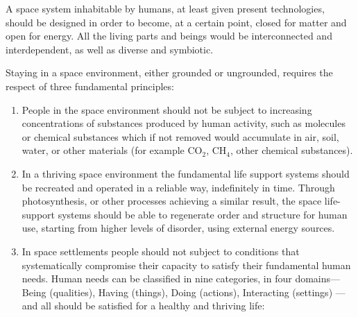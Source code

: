 \documentclass[letter,11pt]{article}
\begin{document}
A space system inhabitable by humans, at least given present technologies,
should be designed in order to become, at a certain point, closed for matter
and open for energy. All the living parts and beings would be interconnected
and interdependent, as well as diverse and symbiotic.
 
Staying in a space environment, either grounded or ungrounded, requires the
respect of three fundamental principles: 

\begin{enumerate}

	\item     People in the space environment should not be subject to increasing
		concentrations of substances produced by human activity, such as molecules
		or chemical substances which if not removed would accumulate in air, soil,
		water, or other materials (for example CO$_2$, CH$_4$, other chemical
		substances).

	\item     In a thriving space environment the fundamental life support
		systems should be recreated and operated in a reliable way, indefinitely in
		time. Through photosynthesis, or other processes achieving a similar
		result, the space life-support systems should be able to regenerate order
		and structure for human use, starting from higher levels of disorder, using
		external energy sources.

 \item     In space settlements people should not subject to conditions that
	 systematically compromise their capacity to satisfy their fundamental human
	 needs. Human needs can be classified in nine categories, in four domains---%
	 Being (qualities), Having (things),  Doing (actions), Interacting (settings)%
	 ---and all should be satisfied for a healthy and thriving life:


\end{enumerate}
\end{document}
